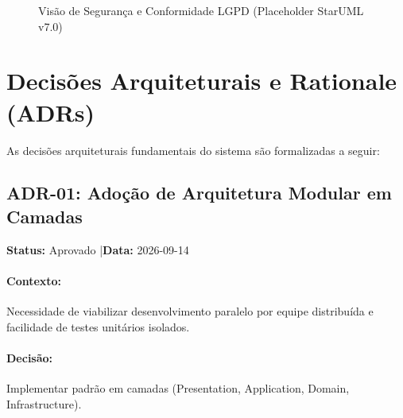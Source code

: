 \begin{figure}[htbp]
    \centering
    \caption{Visão de Segurança e Conformidade LGPD (Placeholder StarUML v7.0)}
    \label{fig:arch_visao_seguranca}
\end{figure}

\section{Decisões Arquiteturais e Rationale (ADRs)}
As decisões arquiteturais fundamentais do sistema são formalizadas a seguir:

\subsection{ADR-01: Adoção de Arquitetura Modular em Camadas}
\textbf{Status:} Aprovado \quad|\quad \textbf{Data:} 2026-09-14

\paragraph{Contexto:} Necessidade de viabilizar desenvolvimento paralelo por equipe distribuída e facilidade de testes unitários isolados.
\paragraph{Decisão:} Implementar padrão em camadas (Presentation, Application, Domain, Infrastructure).
